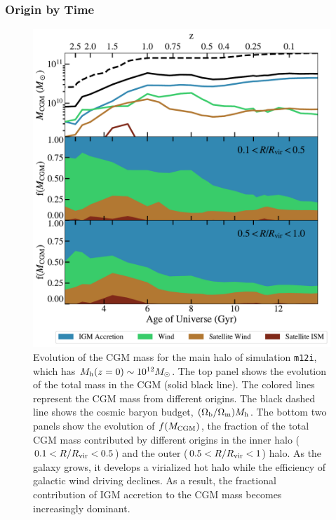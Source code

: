 \documentclass[fleqn,usenatbib]{mnras}
\begin{document}
\subsubsection{Origin by Time}
\label{sec:origin_by_time}
\begin{figure}
\includegraphics[width=\columnwidth]{figures/m12i_CGM_redshift_mass_fraction_galdefv3}
\caption{
Evolution of the CGM mass for the main halo of simulation \texttt{m12i}, which has  $M_{\rm h} ( z=0 )\sim 10^{12} M_\odot$.
The top panel shows the evolution of the total mass in the CGM (solid black line).
The colored lines represent the CGM mass from different origins.
The black dashed line shows the cosmic baryon budget, $(\Omega_{\rm b}/\Omega_{\rm m}) M_{\rm h}$.
The bottom two panels show the evolution of $f(M_{\rm CGM})$, the fraction of the total CGM mass contributed by different origins in the inner halo ($0.1 < R / R_{\rm vir} < 0.5$) and the outer ($0.5 < R/R_{\rm vir} < 1$) halo. 
As the galaxy grows, it develops a virialized hot halo while the efficiency of galactic wind driving declines. 
As a result, the fractional contribution of IGM accretion to the CGM mass becomes increasingly dominant.
}
\label{fig:m12i_CGM_redshift_mass_fraction}
\end{figure}
\end{document}
